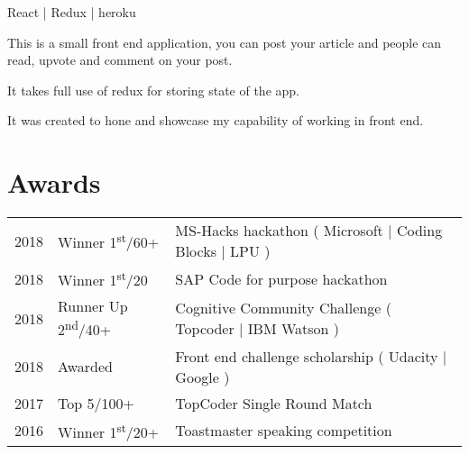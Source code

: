 \documentclass[]{deedy-resume-openfont}
\begin{document}
\begin{minipage}[t]{0.66\textwidth}
\begin{tightemize}
\item React | Redux | heroku
\item This is a small front end application, you can post your article and people can read, upvote and comment on your post.
\item It takes full use of redux for storing state of the app.
\item It was created to hone and showcase my capability of working in front end.
\end{tightemize}
\sectionsep


\section{Awards} 
\begin{tabular}{rll}
2018	     & Winner 1\textsuperscript{st}/60+  & MS-Hacks hackathon ( Microsoft | Coding Blocks | LPU )\\
2018	     & Winner 1\textsuperscript{st}/20  & SAP Code for purpose hackathon\\
2018	     & Runner Up 2\textsuperscript{nd}/40+  & Cognitive Community Challenge ( Topcoder | IBM Watson )\\
2018    & Awarded & Front end challenge scholarship ( Udacity | Google )  \\
2017     & Top 5/100+ & TopCoder Single Round Match \\
2016    & Winner 1\textsuperscript{st}/20+ & Toastmaster speaking competition \\
\end{tabular}
\sectionsep


\end{minipage} 
\end{document}
